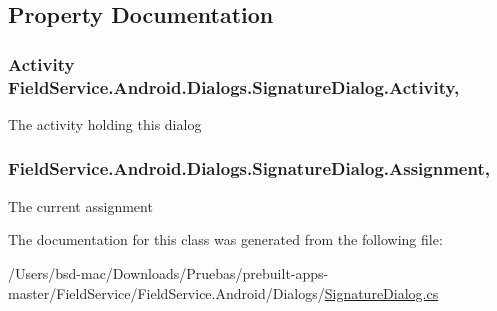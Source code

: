 \subsection{Property Documentation}
\hypertarget{class_field_service_1_1_android_1_1_dialogs_1_1_signature_dialog_a266b81d93f063bf3872a59c2625b53fd}{
\subsubsection[{Activity}]{\setlength{\rightskip}{0pt plus 5cm}Activity Field\+Service.\+Android.\+Dialogs.\+Signature\+Dialog.\+Activity\hspace{0.3cm}{\ttfamily [get]}, {\ttfamily [set]}}}\label{class_field_service_1_1_android_1_1_dialogs_1_1_signature_dialog_a266b81d93f063bf3872a59c2625b53fd}


The activity holding this dialog 

\hypertarget{class_field_service_1_1_android_1_1_dialogs_1_1_signature_dialog_a4a9650b542756aa1937638c19c61d4d9}{
\subsubsection[{Assignment}]{ Field\+Service.\+Android.\+Dialogs.\+Signature\+Dialog.\+Assignment\hspace{0.3cm}{\ttfamily [get]}, {\ttfamily [set]}}}\label{class_field_service_1_1_android_1_1_dialogs_1_1_signature_dialog_a4a9650b542756aa1937638c19c61d4d9}


The current assignment 



The documentation for this class was generated from the following file\+:\begin{DoxyCompactItemize}
\item 
/\+Users/bsd-\/mac/\+Downloads/\+Pruebas/prebuilt-\/apps-\/master/\+Field\+Service/\+Field\+Service.\+Android/\+Dialogs/\hyperlink{_signature_dialog_8cs}{Signature\+Dialog.\+cs}\end{DoxyCompactItemize}
